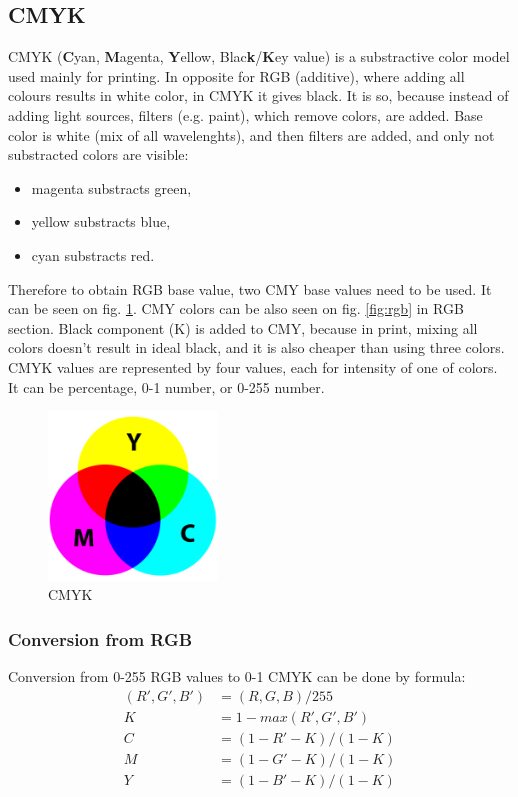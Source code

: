 \documentclass[titlepage]{article}
\begin{document}
\subsection{CMYK}
CMYK (\textbf{C}yan, \textbf{M}agenta, \textbf{Y}ellow,
Blac\textbf{k}/\textbf{K}ey value) is a substractive color model used mainly for
printing. In opposite for RGB (additive), where adding all colours results in
white color, in CMYK it gives black. It is so, because instead of adding light
sources, filters (e.g. paint), which remove colors, are added. Base color is
white (mix of all wavelenghts), and then filters are added, and only not
substracted colors are visible:
\begin{itemize}
  \item magenta substracts green,
  \item yellow substracts blue,
  \item cyan substracts red.
\end{itemize}
Therefore to obtain RGB base value, two CMY base values need to be used. It can
be seen on fig. \ref{fig:cmyk}. CMY colors can be also seen on fig.
\ref{fig:rgb} in RGB section. Black component (K) is added to CMY, because in
print, mixing all colors doesn't result in ideal black, and it is also cheaper
than using three colors. CMYK values are represented by four values, each for
intensity of one of colors. It can be percentage, 0-1 number, or 0-255 number.

\begin{figure}[!htb]
	\centering
	\includegraphics[width=0.4\textwidth]{img/CMYK.png}
	\caption{CMYK} 
	\label{fig:cmyk}
\end{figure}

\subsubsection{Conversion from RGB}
Conversion from 0-255 RGB values to 0-1 CMYK can be done by formula:
\begin{equation}
\begin{split}
(R', G', B') &= (R, G, B)/255 \\
K&=1-max(R', G', B')\\
C&=(1-R'-K)/(1-K)\\
M&=(1-G'-K)/(1-K)\\
Y&=(1-B'-K)/(1-K)
\end{split}
\end{equation}
\end{document}
